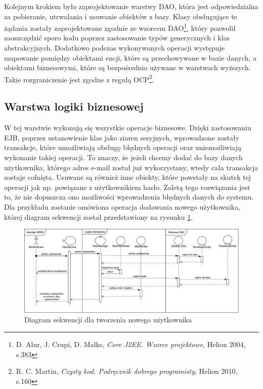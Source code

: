 Kolejnym krokiem było zaprojektowanie warstwy DAO, która jest odpowiedzialna za pobieranie, utrwalania i usuwanie obiektów z bazy. Klasy obsługujące te żądania zostały zaprojektowane zgodnie ze wzorcem DAO\footnote{D. Alur, J. Crupi, D. Malks, \textit{Core J2EE. Wzorce projektowe}, Helion 2004, s.383}, który pozwolił zaoszczędzić sporo kodu poprzez zastosowanie typów generycznych i klas abstrakcyjnych. Dodatkowo podczas wykonywanych operacji występuje mapowanie pomiędzy obiektami encji, które są przechowywane w bazie danych, a obiektami biznesowymi, które są bezpośrednio używane w warstwach wyższych. Takie rozgraniczenie jest zgodne z regułą OCP\footnote{R. C. Martin, \textit{Czysty kod. Podręcznik dobrego programisty}, Helion 2010, s.160}.


\subsection{Warstwa logiki biznesowej}
W tej warstwie wykonują się wszystkie operacje biznesowe. Dzięki zastosowaniu EJB, poprzez ustanowienie klas jako ziaren sesyjnych, wprowadzone zostały transakcje, które umożliwiają obsługę błędnych operacji oraz uniemożliwiają wykonanie takiej operacji. To znaczy, że jeżeli chcemy dodać do bazy danych użytkownika, którego adres e-mail został już wykorzystany, wtedy cała transakcja zostaje cofnięta. Usuwane są również inne obiekty, które powstały na skutek tej operacji jak np. powiązane z użytkownikiem hasło. Zaletą tego rozwiązania jest to, że nie dopuszcza ono możliwości wprowadzenia błędnych danych do systemu. Dla przykładu zostanie omówiona operacja dodawania nowego użytkownika, której diagram sekwencji został przedstawiony na rysunku \ref{fig:diagsekw}. 

\begin{figure}
	\centering
	\includegraphics[width=25cm]{rysunki/diagsekw.pdf}	
	\caption{Diagram sekwencji dla tworzenia nowego użytkownika}
	\label{fig:diagsekw}
\end{figure}


